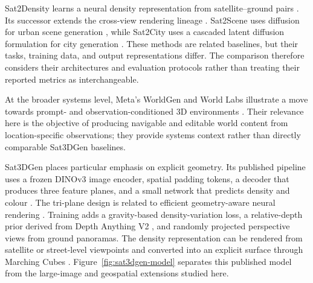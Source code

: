 Sat2Density learns a neural density representation from satellite--ground
pairs \cite{qian2023sat2density}.  Its successor extends the cross-view
rendering lineage \cite{qian2026sat2densitypp}.  Sat2Scene uses diffusion for urban scene
generation \cite{li2024sat2scene}, while Sat2City uses a cascaded latent
diffusion formulation for city generation \cite{hua2025sat2city}.  These
methods are related baselines, but their tasks, training data, and output
representations differ.  The comparison therefore considers their
architectures and evaluation protocols rather than treating their reported
metrics as interchangeable.

At the broader systems level, Meta's WorldGen and World Labs illustrate a move
towards prompt- and observation-conditioned 3D environments
\cite{metaWorldGen2025,worldLabs2026}.  Their relevance here is the objective of
producing navigable and editable world content from location-specific
observations; they provide systems context rather than directly comparable
Sat3DGen baselines.

Sat3DGen places particular emphasis on explicit geometry.  Its published
pipeline uses a frozen DINOv3 image encoder, spatial padding tokens, a decoder
that produces three feature planes, and a small network that predicts density
and colour \cite{simeoni2025dinov3,qian2026sat3dgen}.  The tri-plane design is
related to efficient geometry-aware neural rendering \cite{chan2022eg3d}.
Training adds a gravity-based density-variation loss, a relative-depth prior
derived from Depth Anything V2 \cite{yang2024depthanythingv2}, and randomly
projected perspective views from ground panoramas.  The density representation
can be rendered from satellite or street-level viewpoints and converted into
an explicit surface through Marching Cubes
\cite{qian2026sat3dgen,lorensen1987marching}.  Figure~\ref{fig:sat3dgen-model}
separates this published model from the large-image and geospatial extensions
studied here.

